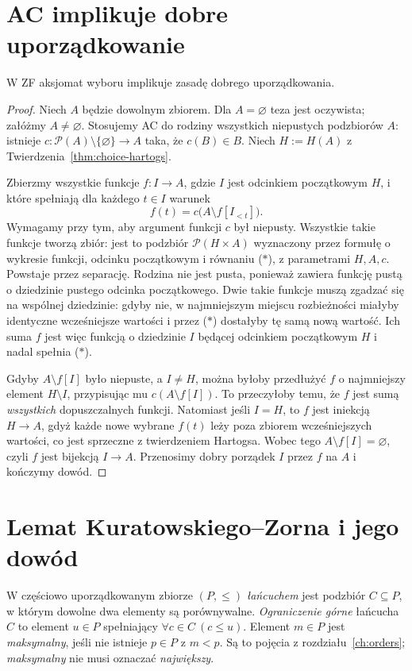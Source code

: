 \section{AC implikuje dobre uporządkowanie}
\begin{twierdzenie}
\label{thm:choice-wellorder}
W ZF aksjomat wyboru implikuje zasadę dobrego uporządkowania.
\end{twierdzenie}
\begin{proof}
Niech $A$ będzie dowolnym zbiorem. Dla $A=\varnothing$
teza jest oczywista; załóżmy $A\ne\varnothing$.
Stosujemy AC do rodziny wszystkich niepustych podzbiorów $A$:
istnieje $c:\mathcal P(A)\setminus\{\varnothing\}\to A$
taka, że $c(B)\in B$.
Niech $H:=H(A)$ z Twierdzenia~\ref{thm:choice-hartogs}.

Zbierzmy wszystkie funkcje $f:I\to A$, gdzie $I$ jest
odcinkiem początkowym $H$, i które spełniają dla każdego
$t\in I$ warunek
\[
 f(t)=c\bigl(A\setminus f[I_{<t}]\bigr).
\tag{$*$}
\]
Wymagamy przy tym, aby argument funkcji $c$ był niepusty.
Wszystkie takie funkcje tworzą zbiór: jest to
podzbiór $\mathcal P(H\times A)$ wyznaczony przez
formułę o wykresie funkcji, odcinku początkowym
i równaniu ($*$), z parametrami $H,A,c$.
Powstaje przez separację. Rodzina nie jest pusta,
ponieważ zawiera funkcję pustą o dziedzinie
pustego odcinka początkowego.
Dwie takie funkcje muszą zgadzać się na wspólnej dziedzinie:
gdyby nie, w najmniejszym miejscu rozbieżności miałyby
identyczne wcześniejsze wartości i przez ($*$) dostałyby
tę samą nową wartość. Ich suma $f$ jest więc funkcją
o dziedzinie $I$ będącej odcinkiem początkowym $H$
i nadal spełnia ($*$).

Gdyby $A\setminus f[I]$ było niepuste, a $I\ne H$,
można byłoby przedłużyć $f$ o najmniejszy element
$H\setminus I$, przypisując mu $c(A\setminus f[I])$.
To przeczyłoby temu, że $f$ jest sumą \emph{wszystkich}
dopuszczalnych funkcji. Natomiast jeśli $I=H$,
to $f$ jest iniekcją $H\to A$, gdyż każde nowe
wybrane $f(t)$ leży poza zbiorem wcześniejszych wartości,
co jest sprzeczne z twierdzeniem Hartogsa. Wobec tego
$A\setminus f[I]=\varnothing$, czyli $f$ jest bijekcją
$I\to A$. Przenosimy dobry porządek $I$ przez $f$
na $A$ i kończymy dowód.
\end{proof}

\section{Lemat Kuratowskiego--Zorna i jego dowód}
\begin{definicja}\label{def:choice-chain}
W częściowo uporządkowanym zbiorze $(P,\le)$
\emph{łańcuchem} jest podzbiór $C\subseteq P$, w którym
dowolne dwa elementy są porównywalne. \emph{Ograniczenie
górne} łańcucha $C$ to element $u\in P$ spełniający
$\forall c\in C\ (c\le u)$. Element $m\in P$ jest
\emph{maksymalny}, jeśli nie istnieje $p\in P$ z $m<p$.
Są to pojęcia z rozdziału~\ref{ch:orders};
\emph{maksymalny} nie musi oznaczać \emph{największy}.
\end{definicja}

